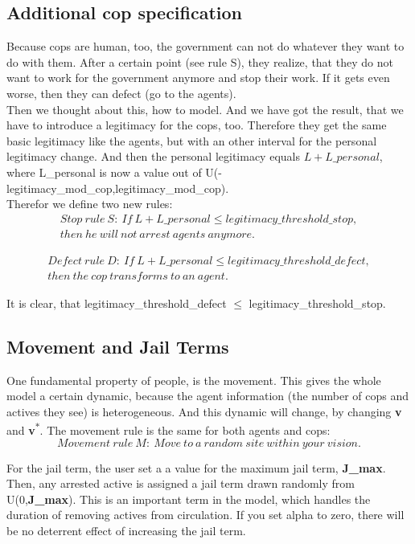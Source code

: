\documentclass[11pt]{article}
\begin{document}
\subsection{Additional cop specification}
Because cops are human, too, the government can not do whatever they want to do with them. After a certain point (see rule S), they realize, that they do not want to work for the government anymore and stop their work. If it gets even worse, then they can defect (go to the agents).\\
Then we thought about this, how to model. And we have got the result, that we have to introduce a legitimacy for the cops, too. Therefore they get the same basic legitimacy like the agents, but with an other interval for the personal legitimacy change. And then the personal legitimacy equals  $L + L\_personal$, where L\_personal is now a value out of U(-legitimacy\_mod\_cop,legitimacy\_mod\_cop).\\
Therefor we define two new rules:
\begin{align*}
Stop~rule~S:~If~L+L\_personal \leq legitimacy\_threshold\_stop ,\\
then~he~will~not~arrest~agents~anymore.
\end{align*}

\begin{align*}
Defect~rule~D:~If~L + L\_personal \leq legitimacy\_threshold\_defect,\\
then~the~ cop~transforms~to~an~agent.
\end{align*}

It is clear, that legitimacy\_threshold\_defect $\leq$  legitimacy\_threshold\_stop. 


\subsection{Movement and Jail Terms}
One fundamental property of people, is the movement. This gives the whole model a certain dynamic, because the agent information (the number of cops and actives they see) is heterogeneous. And this dynamic will change, by changing \textbf{v} and \textbf{v\textsuperscript{$\ast$}}. The movement rule is the same for both agents and cops:
\begin{equation}
Movement~rule~M:~Move~to~a~random~site~within~your~vision.
\end{equation}

For the jail term, the user set a a value for the maximum jail term, \textbf{J\_max}. Then, any arrested active is assigned a jail term drawn randomly from U(0,\textbf{J\_max}). This is an important term in the model, which handles the duration of removing actives from circulation. If you set alpha to zero, there will be no deterrent effect of increasing the jail term.
\end{document}
